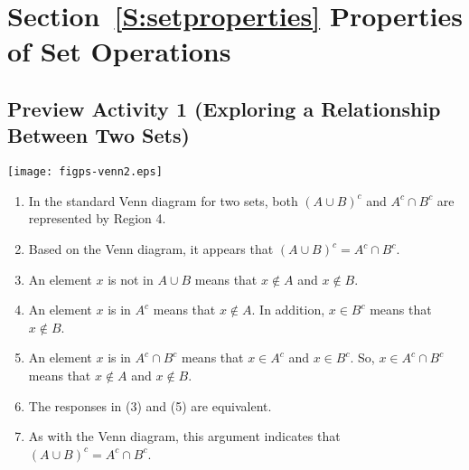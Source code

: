 \section*{Section~\ref{S:setproperties} Properties of Set Operations}

\subsection*{Preview Activity 1 (Exploring a Relationship Between Two Sets)}
\begin{center}
\texttt{[image: figps-venn2.eps]}
\end{center}

\begin{enumerate}
\item In the standard Venn diagram for two sets, both  $\left( {A \cup B} \right)^c $  and  
$A^c  \cap B^c $ are represented by Region 4.	

\item Based on the Venn diagram, it appears that $\left( {A \cup B} \right)^c  = A^c  \cap B^c $.

\item An element  $x$  is not in $A \cup B$  means that  $x \notin A$  and  $x \notin B$.

\item An element  $x$  is in  $A^c $ means that  $x \notin A$.  In addition, $x \in B^c $  means that  
$x \notin B$.

\item An element  $x$  is in $A^c  \cap B^c $ means that   $x \in A^c $ and   $x \in B^c $.  So, $x \in A^c  \cap B^c $ means that   $x \notin A$ and   $x \notin B$.

\item The responses in (3) and (5) are equivalent.

\item As with the Venn diagram, this argument indicates that $\left( {A \cup B} \right)^c  = A^c  \cap B^c $.
\end{enumerate}
\hbreak



